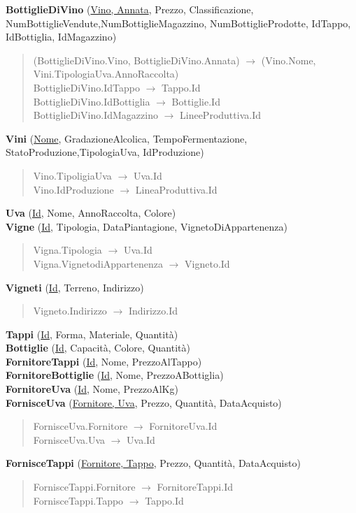 \textbf{BottiglieDiVino} (\underline{Vino, Annata}, Prezzo, Classificazione, NumBottiglieVendute,NumBottiglieMagazzino, NumBottiglieProdotte, IdTappo, IdBottiglia, IdMagazzino)
\begin{verse}
	(BottiglieDiVino.Vino, BottiglieDiVino.Annata) $\to$ (Vino.Nome, Vini.TipologiaUva.AnnoRaccolta)\\
	BottiglieDiVino.IdTappo $\to$ Tappo.Id\\
	BottiglieDiVino.IdBottiglia $\to$ Bottiglie.Id\\
	BottiglieDiVino.IdMagazzino $\to$ LineeProduttiva.Id
\end{verse} 
\textbf{Vini} (\underline{Nome}, GradazioneAlcolica, TempoFermentazione, StatoProduzione,TipologiaUva, IdProduzione)
\begin{verse}
	Vino.TipoligiaUva $\to$ Uva.Id\\
	Vino.IdProduzione $\to$ LineaProduttiva.Id
\end{verse} 
\textbf{Uva} (\underline{Id}, Nome, AnnoRaccolta, Colore)\\
\textbf{Vigne} (\underline{Id}, Tipologia, DataPiantagione, VignetoDiAppartenenza)
\begin{verse}
	Vigna.Tipologia $\to$ Uva.Id\\
	Vigna.VignetodiAppartenenza $\to$ Vigneto.Id
\end{verse} 
\textbf{Vigneti} (\underline{Id}, Terreno, Indirizzo)
\begin{verse}
	Vigneto.Indirizzo $\to$ Indirizzo.Id
\end{verse} 
\textbf{Tappi} (\underline{Id}, Forma, Materiale, Quantità)\\
\textbf{Bottiglie} (\underline{Id}, Capacità, Colore, Quantità)\\
\textbf{FornitoreTappi} (\underline{Id}, Nome, PrezzoAlTappo)\\
\textbf{FornitoreBottiglie} (\underline{Id}, Nome, PrezzoABottiglia)\\
\textbf{FornitoreUva} (\underline{Id}, Nome, PrezzoAlKg)\\
\textbf{FornisceUva} (\underline{Fornitore, Uva}, Prezzo, Quantità, DataAcquisto)
\begin{verse}
	FornisceUva.Fornitore $\to$ FornitoreUva.Id\\
	FornisceUva.Uva $\to$ Uva.Id
\end{verse}
\textbf{FornisceTappi} (\underline{Fornitore, Tappo}, Prezzo, Quantità, DataAcquisto)
\begin{verse}
	FornisceTappi.Fornitore $\to$ FornitoreTappi.Id\\
	FornisceTappi.Tappo $\to$ Tappo.Id
\end{verse} 
